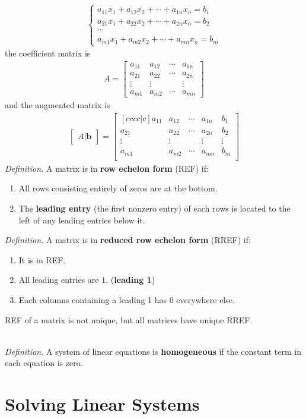 \begin{align*}
	\begin{cases}
	a_{11}x_1 + a_{12}x_2 + \cdots + a_{1n}x_n = b_1 \\
	a_{21}x_1 + a_{22}x_2 + \cdots + a_{2n}x_n = b_2 \\
	\cdots \\
	a_{m1}x_1 + a_{m2}x_2 + \cdots + a_{mn}x_n = b_m
	\end{cases}
\end{align*} the coefficient matrix is
\begin{align*}
A = \begin{bmatrix}
	a_{11} & a_{12} & \cdots & a_{1n} \\
	a_{21} & a_{22} & \cdots & a_{2n} \\
	\vdots & \vdots &        & \vdots \\
	a_{m1} & a_{m2} & \cdots & a_{mn}
\end{bmatrix}
\end{align*} and the augmented matrix is
\begin{align*}
	\begin{bmatrix}
		A | \textbf{b}
	\end{bmatrix} = \begin{bmatrix}[cccc|c]
		a_{11} & a_{12} & \cdots & a_{1n} & b_1 \\
		a_{21} & a_{22} & \cdots & a_{2n} & b_2 \\
		\vdots & \vdots &        & \vdots & \vdots \\
		a_{m1} & a_{m2} & \cdots & a_{mn} & b_m \\
	\end{bmatrix}
\end{align*}
\textit{Definition.} A matrix is in \textbf{row echelon form} (REF) if:
\begin{enumerate}
	\item All rows consisting entirely of zeros are at the bottom.
	\item The \textbf{leading entry} (the first nonzero entry) of each rows is located to the left of any leading entries below it.
\end{enumerate}
\textit{Definition.} A matrix is in \textbf{reduced row echelon form} (RREF) if:
\begin{enumerate}
	\item It is in REF.
	\item All leading entries are 1. (\textbf{leading 1})
	\item Each columns containing a leading 1 has 0 everywhere else.
\end{enumerate}

\noindent REF of a matrix is not unique, but all matrices have unique RREF.

\noindent \\ \textit{Definition.} A system of linear equations is \textbf{homogeneous} if the constant term in each equation is zero.

\section{Solving Linear Systems}

\lipsum[3-4]